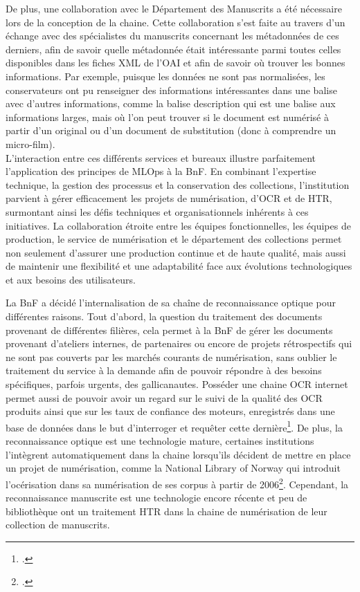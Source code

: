 \documentclass[a4paper,12pt,twoside]{book}
\begin{document}
	De plus, une collaboration avec le Département des Manuscrits a été nécessaire lors de la conception de la chaine. Cette collaboration s’est faite au travers d’un échange avec des spécialistes du manuscrits concernant les métadonnées de ces derniers, afin de savoir quelle métadonnée était intéressante parmi toutes celles disponibles dans les fiches XML de l’OAI et afin de savoir où trouver les bonnes informations. Par exemple, puisque les données ne sont pas normalisées, les conservateurs ont pu renseigner des informations intéressantes dans une balise avec d’autres informations, comme la balise description qui est une balise aux informations larges, mais où l’on peut trouver si le document est numérisé à partir d’un original ou d’un document de substitution (donc à comprendre un micro-film).  
	\\
	
	L’interaction entre ces différents services et bureaux illustre parfaitement l’application des principes de MLOps à la BnF. En combinant l’expertise technique, la gestion des processus et la conservation des collections, l’institution parvient à gérer efficacement les projets de numérisation, d’OCR et de HTR, surmontant ainsi les défis techniques et organisationnels inhérents à ces initiatives. La collaboration étroite entre les équipes fonctionnelles, les équipes de production, le service de numérisation et le département des collections permet non seulement d’assurer une production continue et de haute qualité, mais aussi de maintenir une flexibilité et une adaptabilité face aux évolutions technologiques et aux besoins des utilisateurs.
	
	La BnF a décidé l’internalisation de sa chaîne de reconnaissance optique pour différentes raisons. Tout d’abord, la question du traitement des documents provenant de différentes filières, cela permet à la BnF de gérer les documents provenant d’ateliers internes, de partenaires ou encore de projets rétrospectifs qui ne sont pas couverts par les marchés courants de numérisation, sans oublier le traitement du service à la demande afin de pouvoir répondre à des besoins spécifiques, parfois urgents, des gallicanautes. Posséder une chaine OCR internet permet aussi de pouvoir avoir un regard sur le suivi de la qualité des OCR produits ainsi que sur les taux de confiance des moteurs, enregistrés dans une base de données dans le but d’interroger et requêter cette dernière\footcite{bnf_printemps_2024}.  De plus, la reconnaissance optique est une technologie mature, certaines institutions l’intègrent automatiquement dans la chaine lorsqu’ils décident de mettre en place un projet de numérisation, comme la National Library of Norway qui introduit l’océrisation dans sa numérisation de ses corpus à partir de 2006\footcite{solbakk_implementation_nodate}. Cependant, la reconnaissance manuscrite est une technologie encore récente et peu de bibliothèque ont un traitement HTR dans la chaine de numérisation de leur collection de manuscrits.
	
\end{document}
